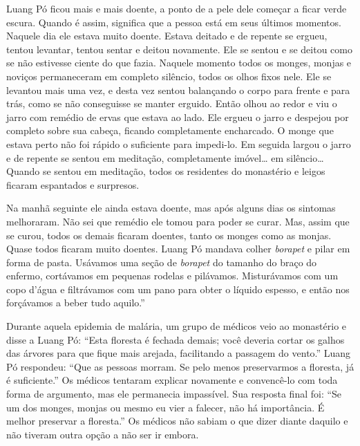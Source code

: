 Luang Pó ficou mais e mais doente, a ponto de a pele dele começar a
ficar verde escura. Quando é assim, significa que a pessoa está em seus
últimos momentos. Naquele dia ele estava muito doente. Estava deitado e
de repente se ergueu, tentou levantar, tentou sentar e deitou novamente.
Ele se sentou e se deitou como se não estivesse ciente do que fazia.
Naquele momento todos os monges, monjas e noviços permaneceram em
completo silêncio, todos os olhos fixos nele. Ele se levantou mais uma
vez, e desta vez sentou balançando o corpo para frente e para trás, como
se não conseguisse se manter erguido. Então olhou ao redor e viu o jarro
com remédio de ervas que estava ao lado. Ele ergueu o jarro e despejou
por completo sobre sua cabeça, ficando completamente encharcado. O monge
que estava perto não foi rápido o suficiente para impedi-lo. Em seguida
largou o jarro e de repente se sentou em meditação, completamente
imóvel\ldots{} em silêncio\ldots{} Quando se sentou em meditação, todos
os residentes do monastério e leigos ficaram espantados e surpresos.

Na manhã seguinte ele ainda estava doente, mas após alguns dias os
sintomas melhoraram. Não sei que remédio ele tomou para poder se curar.
Mas, assim que se curou, todos os demais ficaram doentes, tanto os
monges como as monjas. Quase todos ficaram muito doentes. Luang Pó
mandava colher \emph{borapet} e pilar em forma de pasta. Usávamos uma
seção de \emph{borapet} do tamanho do braço do enfermo, cortávamos em
pequenas rodelas e pilávamos. Misturávamos com um copo d'água e
filtrávamos com um pano para obter o líquido espesso, e então nos
forçávamos a beber tudo aquilo.''

Durante aquela epidemia de malária, um grupo de médicos veio ao
monastério e disse a Luang Pó: ``Esta floresta é fechada demais; você
deveria cortar os galhos das árvores para que fique mais arejada,
facilitando a passagem do vento.'' Luang Pó respondeu: ``Que as pessoas
morram. Se pelo menos preservarmos a floresta, já é suficiente.'' Os
médicos tentaram explicar novamente e convencê-lo com toda forma de
argumento, mas ele permanecia impassível. Sua resposta final foi: ``Se
um dos monges, monjas ou mesmo eu vier a falecer, não há importância. É
melhor preservar a floresta.'' Os médicos não sabiam o que dizer diante
daquilo e não tiveram outra opção a não ser ir embora.
